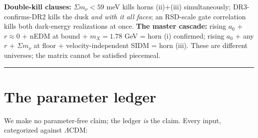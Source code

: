 \documentclass[submission, Phys]{SciPost}
\begin{document}
\textbf{Double-kill clauses:} \(\Sigma m_\nu < 59\) meV kills horns
(ii)+(iii) simultaneously; DR3-confirms-DR2 kills the dusk \emph{and
with it all faces}; an RSD-scale gate correlation kills both dark-energy
realizations at once. \textbf{The master cascade:} rising \(a_0\) +
\(r\approx 0\) + nEDM at bound + \(m_X = 1.78\) GeV = horn (i)
confirmed; rising \(a_0\) + any \(r\) + \(\Sigma m_\nu\) at floor +
velocity-independent SIDM = horn (iii). These are different universes;
the matrix cannot be satisfied piecemeal.

\begin{center}\rule{0.5\linewidth}{0.5pt}\end{center}

\section{The parameter ledger}\label{sec-10}

We make no parameter-free claim; the ledger \emph{is} the claim. Every
input, categorized against \(\Lambda\)CDM:
\end{document}
